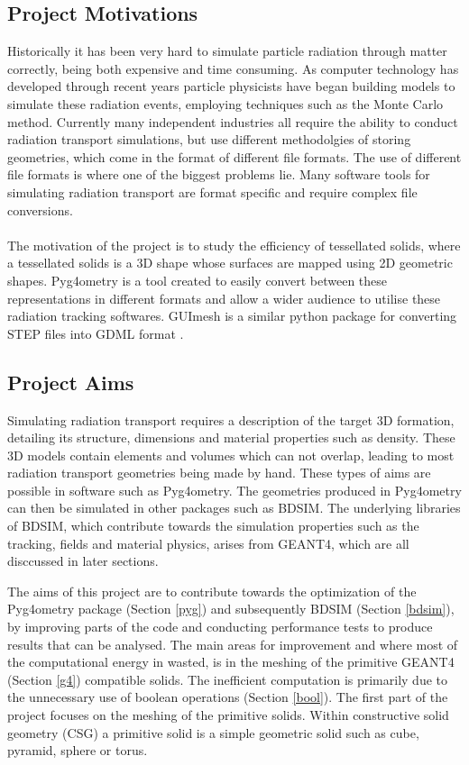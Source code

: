 \documentclass[12pt,a4paper]{article}
\begin{document}
\subsection{Project Motivations}
\label{motiv}
\noindent Historically it has been very hard to simulate particle radiation through matter correctly, being both expensive and time consuming. As computer technology has developed through recent years particle physicists have began building models to simulate these radiation events, employing techniques such as the Monte Carlo method. Currently many independent industries all require the ability to conduct radiation transport simulations, but use different methodolgies of storing geometries, which come in the format of different file formats. The use of different file formats is where one of the biggest problems lie. Many software tools for simulating radiation transport are format specific and require complex file conversions. 
\\\\
The motivation of the project is to study the efficiency of tessellated solids, where a tessellated solids is a 3D shape whose surfaces are mapped using 2D geometric shapes. Pyg4ometry is a tool created to easily convert between these representations in different formats and allow a wider audience to utilise these radiation tracking softwares. GUImesh is a similar python package for converting STEP files into GDML format \cite{meh}.

\subsection{Project Aims}
\label{aim}
Simulating radiation transport requires a description of the target 3D formation, detailing its structure, dimensions and material properties such as density. These 3D models contain elements and volumes which can not overlap, leading to most radiation transport geometries being made by hand. These types of aims are possible in software such as Pyg4ometry. The geometries produced in Pyg4ometry can then be simulated in other packages such as BDSIM. The underlying libraries of BDSIM, which contribute towards the simulation properties such as the tracking, fields and material physics, arises from GEANT4, which are all disccussed in later sections.

The aims of this project are to contribute towards the optimization of the Pyg4ometry package (Section \ref{pyg}) and subsequently BDSIM (Section \ref{bdsim}), by improving parts of the code and conducting performance tests to produce results that can be analysed. The main areas for improvement and where most of the computational energy in wasted, is in the meshing of the primitive GEANT4 (Section \ref{g4}) compatible solids. The inefficient computation is primarily due to the unnecessary use of boolean operations (Section \ref{bool}). The first part of the project focuses on the meshing of the primitive solids. Within constructive solid geometry (CSG) a primitive solid is a simple geometric solid such as cube, pyramid, sphere or torus.
\end{document}
